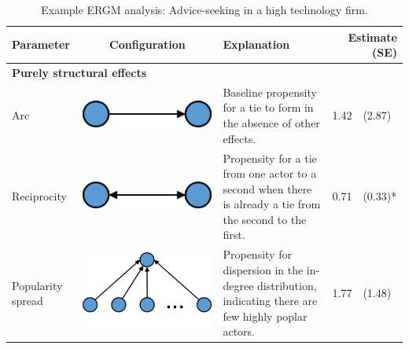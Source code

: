 \begin{landscape}
    \begin{table}[]
    \small
    \centering
    \caption{Example ERGM analysis: Advice-seeking in a high technology firm.}
    \label{ERGM_example}
        \begin{tabular}{lcp{10cm}rl}
            \toprule
            Parameter & Configuration & Explanation & \multicolumn{2}{r}{Estimate (SE)} \\ \midrule
            \multicolumn{5}{l}{\textbf{Purely structural effects}} \\
            Arc & \begin{minipage}{.2\textwidth} \centering \includegraphics[width=0.45\linewidth]{Images/Arc} \end{minipage}  & Baseline propensity for a tie to form in the absence of other effects. & 1.42 & (2.87) \\
            Reciprocity & \begin{minipage}{.2\textwidth} \centering \includegraphics[width=0.45\linewidth]{Images/Reciprocity} \end{minipage}  & Propensity for a tie from one actor to a second when there is already a tie from the second to the first. & 0.71 & (0.33)* \\
            Popularity spread & \begin{minipage}{.2\textwidth} \centering \includegraphics[width=0.8\linewidth]{Images/AinS} \end{minipage}  & Propensity for dispersion in the in-degree distribution, indicating there are few highly poplar actors. & 1.77 & (1.48) \\

\end{tabular}
\end{table}
\end{landscape}
